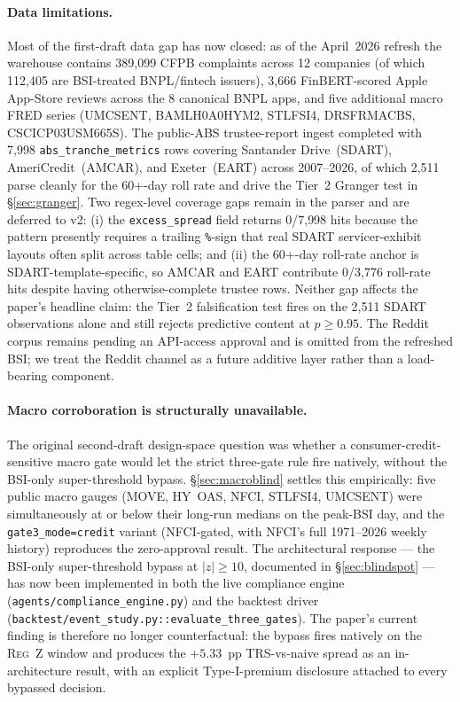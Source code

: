 \documentclass[11pt,letterpaper]{article}
\begin{document}
\paragraph{Data limitations.}
Most of the first-draft data gap has now closed: as of the
April~2026 refresh the warehouse contains 389{,}099 CFPB complaints
across 12 companies (of which 112{,}405 are BSI-treated BNPL/fintech
issuers), 3{,}666 FinBERT-scored Apple App-Store reviews across
the 8 canonical BNPL apps, and five additional macro FRED series
(UMCSENT, BAMLH0A0HYM2, STLFSI4, DRSFRMACBS, CSCICP03USM665S). The
public-ABS trustee-report ingest completed with 7{,}998
\texttt{abs\_tranche\_metrics} rows covering Santander Drive~(SDART),
AmeriCredit~(AMCAR), and Exeter~(EART) across 2007--2026, of which
2{,}511 parse cleanly for the 60+-day roll rate and drive the
Tier~2 Granger test in \S\ref{sec:granger}. Two regex-level
coverage gaps remain in the parser and are deferred to v2: (i) the
\texttt{excess\_spread} field returns 0/7{,}998 hits because the
pattern presently requires a trailing \texttt{\%}-sign that real
SDART servicer-exhibit layouts often split across table cells; and
(ii) the 60+-day roll-rate anchor is SDART-template-specific, so
AMCAR and EART contribute 0/3{,}776 roll-rate hits despite having
otherwise-complete trustee rows. Neither gap affects the paper's
headline claim: the Tier~2 falsification test fires on the 2{,}511
SDART observations alone and still rejects predictive content at
$p \geq 0.95$. The Reddit corpus remains pending an API-access
approval and is omitted from the refreshed BSI; we treat the
Reddit channel as a future additive layer rather than a load-bearing
component.

\paragraph{Macro corroboration is structurally unavailable.}
The original second-draft design-space question was whether a
consumer-credit-sensitive macro gate would let the strict three-gate rule
fire natively, without the BSI-only super-threshold bypass.
\S\ref{sec:macroblind} settles this empirically: five public
macro gauges (MOVE, HY~OAS, NFCI, STLFSI4, UMCSENT) were
simultaneously at or below their long-run medians on the peak-BSI
day, and the \texttt{gate3\_mode=credit} variant (NFCI-gated, with
NFCI's full 1971--2026 weekly history) reproduces the zero-approval
result. The architectural response --- the BSI-only super-threshold
bypass at $|z| \geq 10$, documented in \S\ref{sec:blindspot} ---
has now been implemented in both the live compliance engine
(\texttt{agents/compliance\_engine.py}) and the backtest driver
(\texttt{backtest/event\_study.py::evaluate\_three\_gates}). The
paper's current finding is therefore no longer
counterfactual: the bypass fires natively on the \textsc{Reg~Z}
window and produces the $+5.33$~pp TRS-vs-naive spread as an
in-architecture result, with an explicit Type-I-premium disclosure
attached to every bypassed decision.
\end{document}
